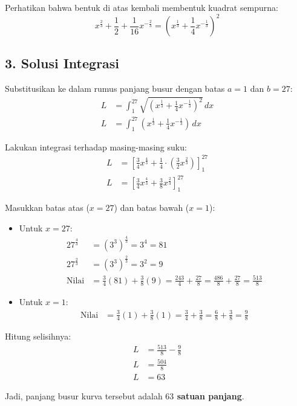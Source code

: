 \documentclass[12pt,a4paper]{article}
\begin{document}
Perhatikan bahwa bentuk di atas kembali membentuk kuadrat sempurna:
\begin{equation*}
  x^{\frac{2}{3}} + \frac{1}{2} + \frac{1}{16}x^{-\frac{2}{3}} = \left(x^{\frac{1}{3}} + \frac{1}{4}x^{-\frac{1}{3}}\right)^2
\end{equation*}

\subsection*{3. Solusi Integrasi}
Substitusikan ke dalam rumus panjang busur dengan batas $a = 1$ dan $b = 27$:
\begin{align*}
  L &= \int_{1}^{27} \sqrt{\left(x^{\frac{1}{3}} + \frac{1}{4}x^{-\frac{1}{3}}\right)^2} \, dx \\
  L &= \int_{1}^{27} \left(x^{\frac{1}{3}} + \frac{1}{4}x^{-\frac{1}{3}}\right) \, dx
\end{align*}

Lakukan integrasi terhadap masing-masing suku:
\begin{align*}
  L &= \left[ \frac{3}{4}x^{\frac{4}{3}} + \frac{1}{4} \cdot \left(\frac{3}{2}x^{\frac{2}{3}}\right) \right]_{1}^{27} \\
  L &= \left[ \frac{3}{4}x^{\frac{4}{3}} + \frac{3}{8}x^{\frac{2}{3}} \right]_{1}^{27}
\end{align*}

Masukkan batas atas ($x = 27$) dan batas bawah ($x = 1$):
\begin{itemize}
  \item Untuk $x = 27$:
    \begin{align*}
      27^{\frac{4}{3}} &= (3^3)^{\frac{4}{3}} = 3^4 = 81 \\
      27^{\frac{2}{3}} &= (3^3)^{\frac{2}{3}} = 3^2 = 9 \\
      \text{Nilai} &= \frac{3}{4}(81) + \frac{3}{8}(9) = \frac{243}{4} + \frac{27}{8} = \frac{486}{8} + \frac{27}{8} = \frac{513}{8}
    \end{align*}
  \item Untuk $x = 1$:
    \begin{align*}
      \text{Nilai} &= \frac{3}{4}(1) + \frac{3}{8}(1) = \frac{3}{4} + \frac{3}{8} = \frac{6}{8} + \frac{3}{8} = \frac{9}{8}
    \end{align*}
\end{itemize}

Hitung selisihnya:
\begin{align*}
  L &= \frac{513}{8} - \frac{9}{8} \\
  L &= \frac{504}{8} \\
  L &= 63
\end{align*}

Jadi, panjang busur kurva tersebut adalah \textbf{$63$ satuan panjang}.
\end{document}
